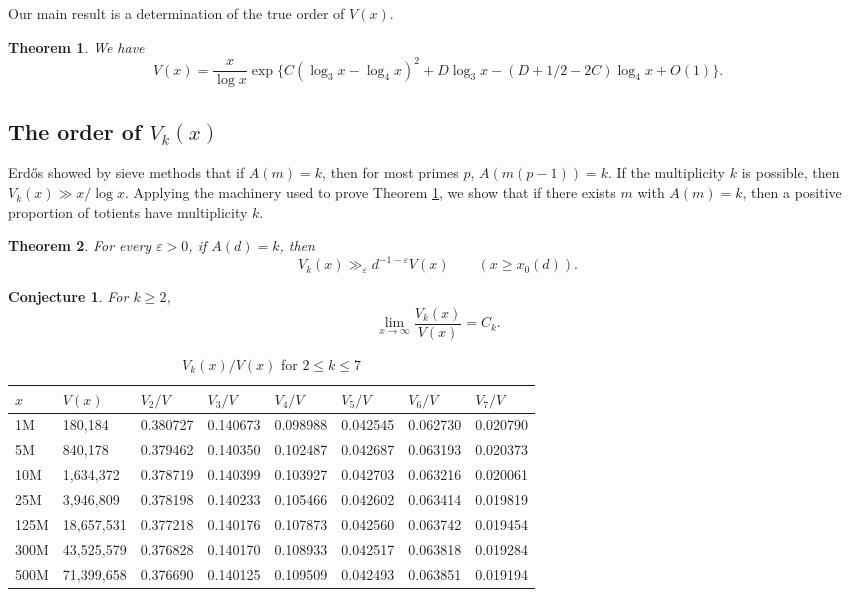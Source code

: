 \documentclass[11pt]{amsart}
\theoremstyle{remark}
\theoremstyle{plain}
\newtheorem{thm}{Theorem}
\newtheorem{conj}{Conjecture}
\numberwithin{equation}{section}
\newcommand{\eps}{\ensuremath{\varepsilon}}
\newcommand{\e}{\ensuremath{\varepsilon}}
\renewcommand{\(}{\left(}
\renewcommand{\)}{\right)}
\renewcommand{\le}{\leqslant}
\renewcommand{\ge}{\geqslant}
\begin{document}
Our main result is a determination of the true order of $V(x)$.
\begin{thm}\label{V(x)} We have
$$
V(x) = \frac{x}{\log x} \exp\{ C(\log_3 x-\log_4 x)^2 +D \log_3 x
- (D+1/2-2C)\log_4 x + O(1) \}.
$$
\end{thm}




\subsection{The order of $V_k(x)$}

Erd\H os \cite{E3} showed by sieve methods that
if $A(m)=k$, then for most primes $p$, $A(m(p-1))=k$.
If the multiplicity $k$ is possible, then
$V_k(x) \gg x/\log x$.  Applying the machinery used to prove
Theorem \ref{V(x)}, we show that if there exists $m$ with
$A(m)=k$, then a positive proportion of totients have multiplicity $k$.

\begin{thm}\label{V_k(x)} 
For every $\eps>0$, if $A(d)=k$, then 
$$
V_k(x) \gg_\e d^{-1-\e} V(x) \qquad (x\ge x_0(d)).
$$
\end{thm}

\begin{conj}
For $k \ge 2$,
$$
\lim_{x\to \infty} \frac{V_k(x)}{V(x)} = C_k.
$$
\end{conj}



\begin{table}
\begin{tabular}{|l|l|l|l|l|l|l|l|}
\hline
$x$ &  $V(x)$  &  $V_2/V$ & $V_3/V$ & $V_4/V$   &
   $V_5/V$   & $V_6/V$    & $V_7/V$  \\
\hline
 1M &      180,184 & 0.380727 & 0.140673 & 0.098988 &
                              0.042545 & 0.062730 & 0.020790 \\
  5M &     840,178 & 0.379462 & 0.140350 & 0.102487 &
                              0.042687 & 0.063193 & 0.020373 \\
 10M &   1,634,372 & 0.378719 & 0.140399 & 0.103927 &
                              0.042703 & 0.063216 & 0.020061 \\
 25M &   3,946,809 & 0.378198 & 0.140233 & 0.105466 &
                              0.042602 & 0.063414 & 0.019819 \\
 125M & 18,657,531 & 0.377218 & 0.140176 & 0.107873 &
                              0.042560 & 0.063742 & 0.019454 \\
 300M & 43,525,579 & 0.376828 & 0.140170 & 0.108933 &
                              0.042517 & 0.063818 & 0.019284 \\
 500M & 71,399,658 & 0.376690 & 0.140125 & 0.109509 &
                             0.042493 & 0.063851 & 0.019194 \\
\hline
\end{tabular}
\smallskip
\caption{$V_k(x)/V(x)$ for $2\le k\le 7$}
\end{table}
\end{document}
